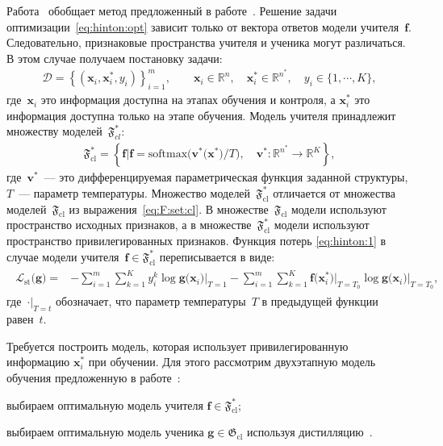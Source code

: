 \documentclass[12pt]{a&t}
\begin{document}
Работа~\cite{Lopez2016} обобщает метод предложенный в работе~\cite{Hinton2015}. Решение задачи оптимизации~\eqref{eq:hinton:opt} зависит только от вектора ответов модели учителя~$\mathbf{f}$. Следовательно, признаковые пространства учителя и ученика могут различаться. В этом случае получаем постановку задачи:
\begin{gather}
    \mathcal{D} = \left\{\left(\mathbf{x}_i, \mathbf{x}^*_i, y_i\right)\right\}_{i=1}^{m}, \qquad \mathbf{x}_i \in \mathbb{R}^{n}, \quad \mathbf{x}^*_i \in \mathbb{R}^{n^*}, \quad y_i \in \{1, \cdots, K\},
\end{gather}
где~$\mathbf{x}_i$ это информация доступна на этапах обучения и контроля, а $\mathbf{x}^*_i$ это информация доступна только на этапе обучения. Модель учителя принадлежит множеству моделей~$\mathfrak{F}_{cl}^*$:
\begin{gather}
\label{eq:F:set:cl:priv}
\mathfrak{F}_{\text{cl}}^* = \left\{\mathbf{f}| \mathbf{f} = \text{softmax}\bigr(\mathbf{v}^*\bigr(\mathbf{x}^*\bigr)/T\bigr), \quad \mathbf{v}^*: \mathbb{R}^{n^*} \to \mathbb{R}^K \right\},
\end{gather}
где~$\mathbf{v}^*$~--- это дифференцируемая параметрическая функция заданной структуры, $T$~--- параметр температуры. Множество моделей~$\mathfrak{F}_\text{cl}^*$ отличается от множества моделей~$\mathfrak{F}_\text{cl}$ из выражения~\eqref{eq:F:set:cl}. В множестве~$\mathfrak{F}_\text{cl}$ модели используют пространство исходных признаков, а в множестве~$\mathfrak{F}_\text{cl}^*$ модели используют пространство привилегированных признаков. Функция потерь \eqref{eq:hinton:1} в случае модели учителя~$\mathbf{f} \in \mathfrak{F}_\text{cl}^*$ переписывается в виде:
\begin{gather}
\label{eq:hinton:L:new}
\begin{aligned}
   \mathcal{L}_\text{st}\bigr(\mathbf{g}\bigr) = &-\sum_{i=1}^{m}{\sum_{k=1}^{K}y^k_i\log\mathbf{g}\bigr(\mathbf{x}_i\bigr)\bigr|_{T=1}}-\sum_{i=1}^{m}{\sum_{k=1}^{K}\mathbf{f}\bigr(\mathbf{x}^*_i\bigr)\bigr|_{T=T_0}\log\mathbf{g}\bigr(\mathbf{x}_i\bigr)\bigr|_{T=T_0}},
\end{aligned}
\end{gather}
где~$\cdot\bigr|_{T=t}$ обозначает, что параметр температуры~$T$ в предыдущей функции равен~$t$.

Требуется построить модель, которая использует привилегированную информацию $\mathbf{x}^*_i$ при обучении. Для этого рассмотрим двухэтапную модель обучения предложенную в работе~\cite{Lopez2016}:
\begin{enumlist}
    \item выбираем оптимальную модель учителя $\mathbf{f} \in \mathfrak{F}_{\text{cl}}^*$;
    \item выбираем оптимальную модель ученика $\mathbf{g} \in \mathfrak{G}_{\text{cl}}$ используя дистилляцию~\cite{Hinton2015}. 
\end{enumlist}
\end{document}
